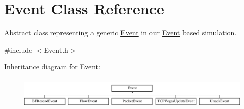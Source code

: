 \hypertarget{classEvent}{\section{\-Event \-Class \-Reference}
\label{classEvent}
}


\-Abstract class representing a generic \hyperlink{classEvent}{\-Event} in our \hyperlink{classEvent}{\-Event} based simulation.  




{\ttfamily \#include $<$\-Event.\-h$>$}

\-Inheritance diagram for \-Event\-:\begin{figure}[H]
\begin{center}
\leavevmode
\includegraphics[height=1.483444cm]{classEvent}
\end{center}
\end{figure}
